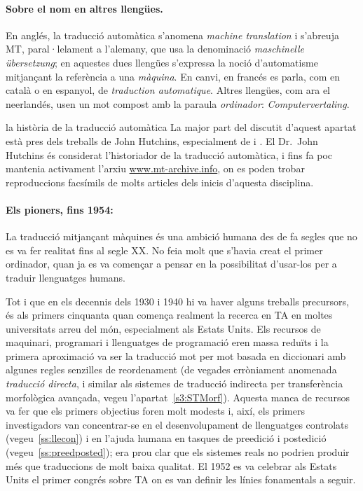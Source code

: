 \paragraph{Sobre el nom en altres llengües.}
En anglés, la traducció automàtica s'anomena \emph{machine
  translation} i s'abreuja MT, paral·lelament a l'alemany, que usa la
denominació \emph{maschinelle übersetzung}; en aquestes dues llengües
s'expressa la noció d'automatisme mitjançant la referència a una {\em
  màquina}. En canvi, en francés es parla, com en català o en
espanyol, de {\em traduction automatique}. Altres llengües, com ara el
neerlandés, usen un mot compost amb la paraula \emph{ordinador}:
\emph{Computervertaling}.

\begin{persabermes}{la història de la traducció automàtica}
  La major part del discutit d'aquest apartat està pres dels treballs
  de John Hutchins, especialment de \cite{hutchins1995} i
  \cite{hutchins2001}. El Dr.\ John Hutchins és considerat
  l'historiador de la traducció automàtica, i fins fa poc mantenia
  activament l'arxiu \url{www.mt-archive.info}, on es poden trobar
  reproduccions facsímils de molts articles dels inicis d'aquesta
  disciplina.

  \paragraph{Els pioners, fins 1954:} La traducció mitjançant màquines
  és una ambició humana des de fa segles que no es va fer realitat
  fins al segle XX. No feia molt que s'havia creat el primer
  ordinador, quan ja es va començar a pensar en la possibilitat
  d'usar-los per a traduir llenguatges humans.

  Tot i que en els decennis dels 1930 i 1940 hi va haver alguns
  treballs precursors, és als primers cinquanta quan comença realment
  la recerca en TA en moltes universitats arreu del món, especialment
  als Estats Units. Els recursos de maquinari, programari i
  llenguatges de programació eren massa reduïts i la primera
  aproximació va ser la traducció mot per mot basada en diccionari amb
  algunes regles senzilles de reordenament (de vegades erròniament
  anomenada \emph{traducció directa}, i similar als sistemes de traducció indirecta per transferència morfològica avançada, vegeu 
  l'apartat~\ref{s3:STMorf}). Aquesta manca de recursos va fer que
  els primers objectius foren molt modests i, així, els primers
  investigadors van concentrar-se en el desenvolupament de llenguatges
  controlats (vegeu~\ref{ss:llecon}) i en l'ajuda humana en tasques de
  preedició i postedició (vegeu~\ref{ss:preedposted}); era prou clar
  que els sistemes reals no podrien produir més que traduccions de
  molt baixa qualitat.  El 1952 es va celebrar als Estats Units el
  primer congrés sobre TA on es van definir les línies fonamentals a
  seguir.


\end{persabermes}

